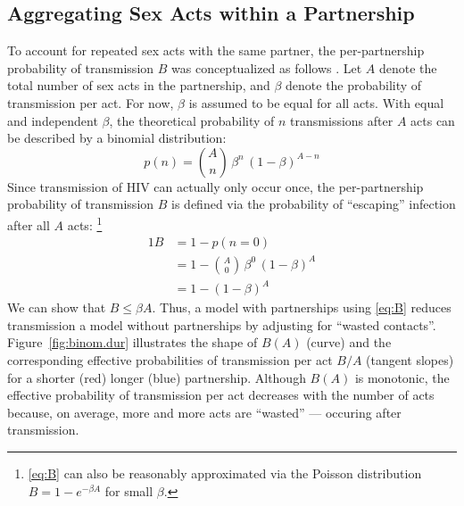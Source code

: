 \subsection{Aggregating Sex Acts within a Partnership}\label{foi.prior.bhom}
To account for repeated sex acts with the same partner,
the per-partnership probability of transmission $B$ was conceptualized as follows \cite{Allard1990}.
Let $A$ denote the total number of sex acts in the partnership,
and $\beta$ denote the probability of transmission per act.
For now, $\beta$ is assumed to be equal for all acts.
With equal and independent $\beta$,
the theoretical probability of $n$ transmissions after $A$ acts
can be described by a binomial distribution:
\begin{equation}\label{eq:B.n}
  p(n) = {A \choose n}\,\beta^n\,{(1 - \beta)}^{A-n}
\end{equation}
Since transmission of HIV can actually only occur once,
the per-partnership probability of transmission $B$ is defined via
the probability of ``escaping'' infection after all $A$ acts:%
\footnote{\eqref{eq:B} can also be reasonably approximated
  via the Poisson distribution $B = 1 - e^{-\beta A}$ for small $\beta$.}
\begin{alignat}{1}\label{eq:B}
  B &= 1 - p(n = 0) \nonumber\\
  &= 1 - {A \choose 0}\,\beta^0\,{(1 - \beta)}^{A} \nonumber\\
  &= 1 - {(1 - \beta)}^A
\end{alignat}
We can show that $B \le \beta A$.
Thus, a model with partnerships using \eqref{eq:B}
reduces transmission \vs a model without partnerships
by adjusting for ``wasted contacts''.
Figure~\ref{fig:binom.dur} illustrates the shape of $B(A)$ (curve)
and the corresponding effective probabilities of transmission per act $B/A$ (tangent slopes)
for a shorter (red) \vs longer (blue) partnership.
Although $B(A)$ is monotonic, the effective probability of transmission per act
decreases with the number of acts because, on average,
more and more acts are ``wasted'' --- occuring after transmission.
